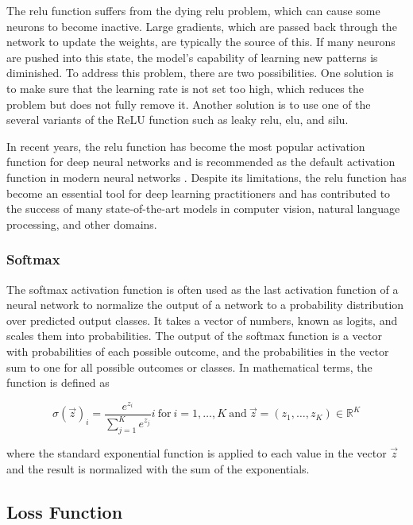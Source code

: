 \documentclass[draft,final]{vutinfth} %
\begin{document}
The \gls{relu} function suffers from the dying \gls{relu} problem,
which can cause some neurons to become inactive. Large gradients,
which are passed back through the network to update the weights, are
typically the source of this. If many neurons are pushed into this
state, the model's capability of learning new patterns is
diminished. To address this problem, there are two possibilities. One
solution is to make sure that the learning rate is not set too high,
which reduces the problem but does not fully remove it. Another
solution is to use one of the several variants of the ReLU function
such as leaky \gls{relu}, \gls{elu}, and \gls{silu}.

In recent years, the \gls{relu} function has become the most popular
activation function for deep neural networks and is recommended as the
default activation function in modern neural networks
\cite{goodfellow2016}. Despite its limitations, the \gls{relu}
function has become an essential tool for deep learning practitioners
and has contributed to the success of many state-of-the-art models in
computer vision, natural language processing, and other domains.

\subsubsection{Softmax}
\label{sssec:theory-softmax}

The softmax activation function is often used as the last activation
function of a neural network to normalize the output of a network to a
probability distribution over predicted output classes. It takes a
vector of numbers, known as logits, and scales them into
probabilities. The output of the softmax function is a vector with
probabilities of each possible outcome, and the probabilities in the
vector sum to one for all possible outcomes or classes. In
mathematical terms, the function is defined as

\begin{equation}
  \label{eq:softmax}
  \sigma(\vec{z})_{i} = \frac{e^{z_i}}{\sum_{j=1}^Ke^{z_j}}i\ \mathrm{for}\ i = 1,\dots,K\ \mathrm{and}\ \vec{z} = (z_1,\dots,z_K)\in\mathbb{R}^K
\end{equation}

where the standard exponential function is applied to each value in
the vector $\vec{z}$ and the result is normalized with the sum of the
exponentials.

\subsection{Loss Function}
\label{ssec:theory-loss-function}
\end{document}
